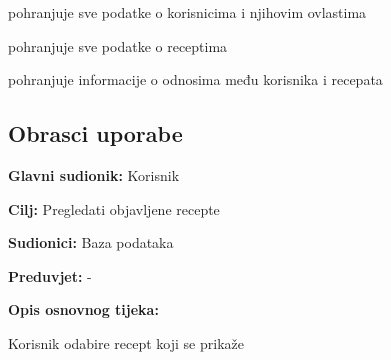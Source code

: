 \begin{packed_enum}
\begin{packed_enum}
				\end{packed_enum}
			
				\item  {}
				
				\begin{packed_enum}
					
					\item pohranjuje sve podatke o korisnicima i njihovim ovlastima
					\item pohranjuje sve podatke o receptima
					\item pohranjuje informacije o odnosima među korisnika i recepata
					
				\end{packed_enum}
			\end{packed_enum}
			
			\eject 
			
			
				
			\subsection{Obrasci uporabe}
					
					\noindent {}
					\begin{packed_item}
						
						\item \textbf{Glavni sudionik: }Korisnik
						\item \textbf{Cilj: }Pregledati objavljene recepte
						\item \textbf{Sudionici: }Baza podataka
						\item \textbf{Preduvjet: }-
						\item \textbf{Opis osnovnog tijeka:}
						
						\item[] \begin{packed_enum}
								\item Korisnik odabire recept koji se prikaže
								\end{packed_enum}
					\end{packed_item}
					
